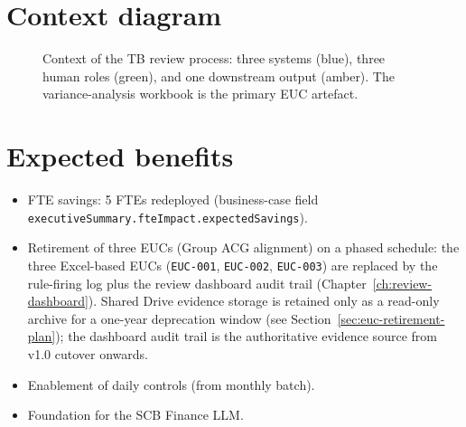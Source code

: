 \section{Context diagram}

\begin{figure}[htbp]
\centering
{}
\caption{Context of the TB review process: three systems (blue), three
human roles (green), and one downstream output (amber). The
variance-analysis workbook is the primary EUC artefact.}\label{fig:context}
\end{figure}

\section{Expected benefits}

\begin{itemize}
  \item FTE savings: 5 FTEs redeployed (business-case field
        \texttt{executiveSummary.\allowbreak fteImpact.\allowbreak expectedSavings}).
  \item Retirement of three EUCs (Group ACG alignment) on a
        phased schedule: the three Excel-based EUCs
        (\texttt{EUC-001}, \texttt{EUC-002}, \texttt{EUC-003}) are
        replaced by the rule-firing log plus the review dashboard
        audit trail (Chapter~\ref{ch:review-dashboard}). Shared
        Drive evidence storage is retained only as a read-only
        archive for a one-year deprecation window
        (see Section~\ref{sec:euc-retirement-plan}); the dashboard
        audit trail is the authoritative evidence source from
        v1.0 cutover onwards.
  \item Enablement of daily controls (from monthly batch).
  \item Foundation for the SCB Finance LLM.
\end{itemize}


